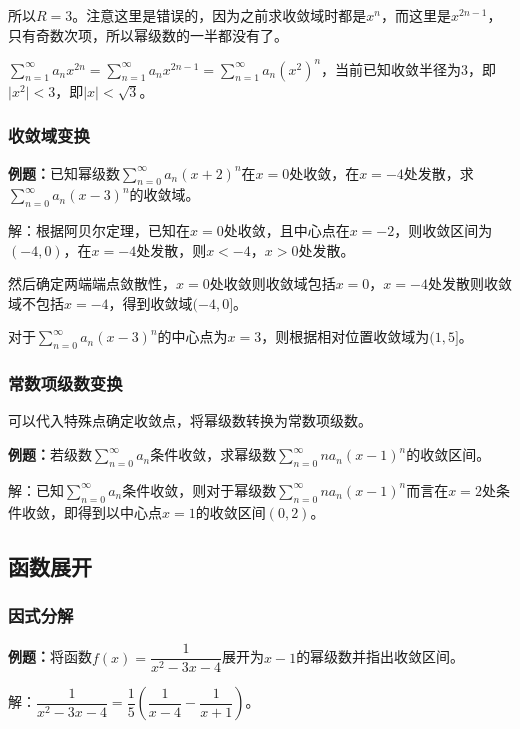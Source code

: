 所以$R=3$。注意这里是错误的，因为之前求收敛域时都是$x^n$，而这里是$x^{2n-1}$，只有奇数次项，所以幂级数的一半都没有了。

$\sum\limits_{n=1}^\infty a_nx^{2n}=\sum\limits_{n=1}^\infty a_nx^{2n-1}=\sum\limits_{n=1}^\infty a_n(x^2)^n$，当前已知收敛半径为$3$，即$\vert x^2\vert<3$，即$\vert x\vert<\sqrt{3}$。

\subsubsection{收敛域变换}

\textbf{例题：}已知幂级数$\sum\limits_{n=0}^\infty a_n(x+2)^n$在$x=0$处收敛，在$x=-4$处发散，求$\sum\limits_{n=0}^\infty a_n(x-3)^n$的收敛域。

解：根据阿贝尔定理，已知在$x=0$处收敛，且中心点在$x=-2$，则收敛区间为$(-4,0)$，在$x=-4$处发散，则$x<-4$，$x>0$处发散。

然后确定两端端点敛散性，$x=0$处收敛则收敛域包括$x=0$，$x=-4$处发散则收敛域不包括$x=-4$，得到收敛域$(-4,0]$。

对于$\sum\limits_{n=0}^\infty a_n(x-3)^n$的中心点为$x=3$，则根据相对位置收敛域为$(1,5]$。

\subsubsection{常数项级数变换}

可以代入特殊点确定收敛点，将幂级数转换为常数项级数。

\textbf{例题：}若级数$\sum\limits_{n=0}^\infty a_n$条件收敛，求幂级数$\sum\limits_{n=0}^\infty na_n(x-1)^n$的收敛区间。

解：已知$\sum\limits_{n=0}^\infty a_n$条件收敛，则对于幂级数$\sum\limits_{n=0}^\infty na_n(x-1)^n$而言在$x=2$处条件收敛，即得到以中心点$x=1$的收敛区间$(0,2)$。

\subsection{函数展开}

\subsubsection{因式分解}

\textbf{例题：}将函数$f(x)=\dfrac{1}{x^2-3x-4}$展开为$x-1$的幂级数并指出收敛区间。

解：$\dfrac{1}{x^2-3x-4}=\dfrac{1}{5}\left(\dfrac{1}{x-4}-\dfrac{1}{x+1}\right)$。

